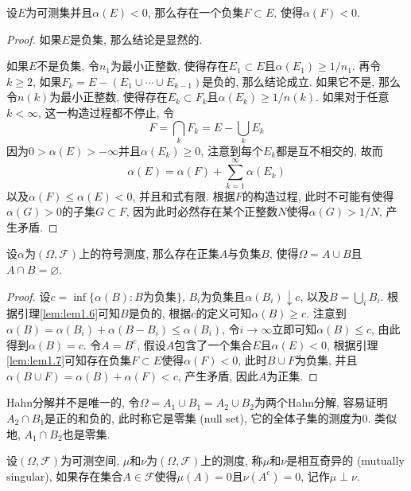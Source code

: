 \documentclass[cn, 12pt, math=mtpro2, bibstyle=apa, blue, twocol]{elegantbook}
\newcommand{\F}{\mathcal{F}}
\let\emptyset\varnothing
\begin{document}
\begin{lemma}\label{lem:lem1.7}
设$E$为可测集并且$\alpha(E)<0$, 那么存在一个负集$F\subset E$, 使得$\alpha(F)<0$.
\end{lemma}
\begin{proof}
  如果$E$是负集, 那么结论是显然的.

  如果$E$不是负集, 令$n_1$为最小正整数, 使得存在$E_1\subset E$且$\alpha(E_1)\ge1/n_1$. 再令$k\ge2$, 如果$F_k=E-(E_1\cup\cdots\cup E_{k-1})$是负的, 那么结论成立. 如果它不是, 那么令$n(k)$为最小正整数, 使得存在$E_k\subset F_k$且$\alpha(E_k)\geq 1/n(k)$. 如果对于任意$k<\infty$, 这一构造过程都不停止, 令
  $$F=\bigcap_kF_k=E-\bigcup_kE_k$$
  因为$0>\alpha(E)>-\infty$并且$\alpha(E_k)\ge0$, 注意到每个$E_k$都是互不相交的, 故而
  $$\alpha(E)=\alpha(F)+\sum_{k=1}^{\infty}\alpha(E_k)$$
  以及$\alpha(F)\leq \alpha(E)<0$, 并且和式有限. 根据$F$的构造过程, 此时不可能有使得$\alpha(G)>0$的子集$G\subset F$, 因为此时必然存在某个正整数$N$使得$\alpha(G)>1/N$, 产生矛盾.
\end{proof}

\begin{theorem}[Hahn分解定理]
  设$\alpha$为$(\Omega,\F)$上的符号测度, 那么存在正集$A$与负集$B$, 使得$\Omega=A\cup B$且$A\cap B=\emptyset$.
\end{theorem}
\begin{proof}
  设$c=\inf\{\alpha(B): B\text{为负集}\}$, $B_i$为负集且$\alpha(B_i)\downarrow c$, 以及$B=\bigcup_iB_i$. 根据引理\ref{lem:lem1.6}可知$B$是负的, 根据$c$的定义可知$\alpha(B)\ge c$. 注意到$\alpha(B)=\alpha(B_i)+\alpha(B-B_i)\leq \alpha(B_i)$, 令$i\to\infty$立即可知$\alpha(B)\leq c$, 由此得到$\alpha(B)=c$. 令$A=B^c$, 假设$A$包含了一个集合$E$且$\alpha(E)<0$, 根据引理\ref{lem:lem1.7}可知存在负集$F\subset E$使得$\alpha(F)<0$, 此时$B\cup F$为负集, 并且$\alpha(B\cup F)=\alpha(B)+\alpha(F)<c$, 产生矛盾, 因此$A$为正集.
\end{proof}
Hahn分解并不是唯一的, 令$\Omega=A_1\cup B_1=A_2\cup B_2$为两个Hahn分解, 容易证明$A_2\cap B_1$是正的和负的, 此时称它是零集 (null set), 它的全体子集的测度为0. 类似地, $A_1\cap B_2$也是零集.

\begin{definition}
设$(\Omega,\F)$为可测空间, $\mu$和$\nu$为$(\Omega,\F)$上的测度, 称$\mu$和$\nu$是相互奇异的 (mutually singular), 如果存在集合$A\in\F$使得$\mu(A)=0$且$\nu(A^c)=0$, 记作$\mu\perp\nu$.
\end{definition}
\end{document}
